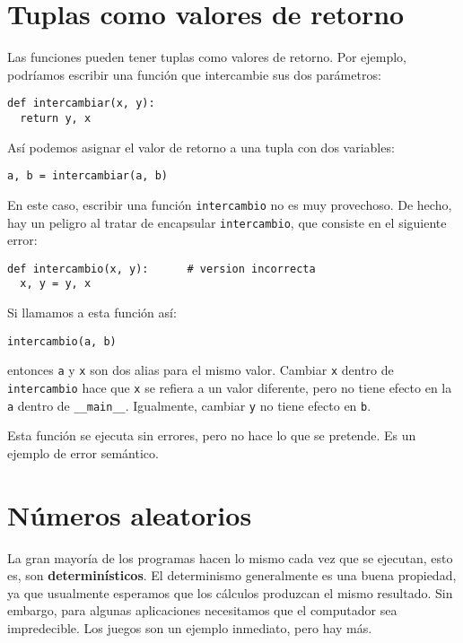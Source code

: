 \section{Tuplas como valores de retorno}

  

Las funciones pueden tener tuplas como valores de retorno. Por ejemplo,
podríamos escribir una función que intercambie sus dos parámetros:
\begin{verbatim}
def intercambiar(x, y):
  return y, x
\end{verbatim}

Así podemos asignar el valor de retorno a una tupla con dos variables:
\begin{verbatim}
a, b = intercambiar(a, b)
\end{verbatim}

En este caso, escribir una función \texttt{intercambio} no es muy
provechoso. De hecho, hay un peligro al tratar de encapsular \texttt{intercambio},
que consiste en el siguiente error:
\begin{verbatim}
def intercambio(x, y):      # version incorrecta
  x, y = y, x
\end{verbatim}

Si llamamos a esta función así:
\begin{verbatim}
intercambio(a, b)
\end{verbatim}

entonces \texttt{a} y \texttt{x} son dos alias para el mismo valor.
Cambiar \texttt{x} dentro de \texttt{intercambio} hace que \texttt{x}
se refiera a un valor diferente, pero no tiene efecto en la \texttt{a}
dentro de \texttt{\_\_main\_\_}. Igualmente, cambiar \texttt{y} no
tiene efecto en \texttt{b}.

Esta función se ejecuta sin errores, pero no hace lo que se pretende.
Es un ejemplo de error semántico.


\section{Números aleatorios}

 

La gran mayoría de los programas hacen lo mismo cada vez que se ejecutan,
esto es, son \textbf{determinísticos}. El determinismo generalmente
es una buena propiedad, ya que usualmente esperamos que los cálculos
produzcan el mismo resultado. Sin embargo, para algunas aplicaciones
necesitamos que el computador sea impredecible. Los juegos son un
ejemplo inmediato, pero hay más.


